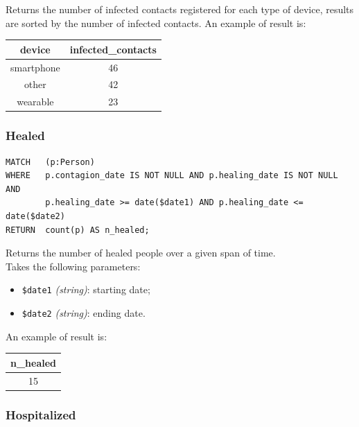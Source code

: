 \documentclass[12pt, a4paper]{article}
\begin{document}
\noindent %
Returns the number of infected contacts registered for each type of device, 
results are sorted by the number of infected contacts. 
An example of result is: 

\begin{center}
    \begin{tabular}{ |c|c|} 
        \hline
        device & infected\_contacts\\
        \hline
        smartphone & 46 \\
        other & 42\\
        wearable & 23\\
        \hline
    \end{tabular}
\end{center}

\subsubsection{Healed}

\begin{tcolorbox}[fontupper=\scriptsize]
    \begin{verbatim}
MATCH   (p:Person)
WHERE   p.contagion_date IS NOT NULL AND p.healing_date IS NOT NULL AND
        p.healing_date >= date($date1) AND p.healing_date <= date($date2)
RETURN  count(p) AS n_healed;
    \end{verbatim}
\end{tcolorbox}

\noindent %
Returns the number of healed people over a given span of time. \\
Takes the following parameters: 
\begin{itemize}
    \item \texttt{\$date1} \emph{(string)}: starting date;
    \item \texttt{\$date2} \emph{(string)}: ending date.
\end{itemize}

\noindent %
An example of result is:
\begin{center}
    \begin{tabular}{ |c| } 
        \hline
        n\_healed \\
        \hline
        15 \\
        \hline
    \end{tabular}
\end{center}

\subsubsection{Hospitalized}
\end{document}
